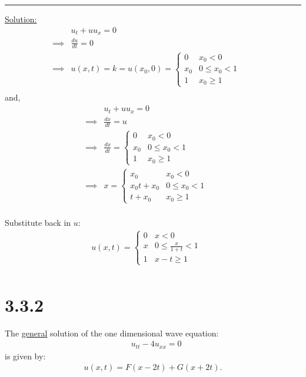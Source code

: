 \documentclass{article}
\begin{document}
\begin{center}
  \noindent\rule{8cm}{0.4pt}
\end{center}

\underline{Solution:}
\begin{align*}
  &u_t + u u_x = 0 &&\\
  \implies& \frac{du}{dt} = 0 &&\\
  \implies& u(x,t) = k = u(x_0, 0) = \begin{cases}
    0 & x_0 < 0 \\
    x_0 & 0 \leq x_0 < 1 \\
    1 & x_0 \geq 1
  \end{cases} &&\\
\end{align*}
and,
\begin{align*}
  &u_t + u u_x = 0 &&\\
  \implies& \frac{dx}{dt} = u &&\\
  \implies& \frac{dx}{dt} = \begin{cases}
    0 & x_0 < 0 \\
    x_0 & 0 \leq x_0 < 1 \\
    1 & x_0 \geq 1
  \end{cases} &&\\
  \implies& x = \begin{cases}
    x_0 & x_0 < 0 \\
    x_0t + x_0 & 0 \leq x_0 < 1 \\
    t + x_0 & x_0 \geq 1
  \end{cases} &&\\
\end{align*}

Substitute back in $u$:
\begin{align*}
  u(x,t) = \begin{cases}
    0 & x < 0 \\
    x & 0 \leq \frac{x}{1+t} < 1 \\
    1 & x-t \geq 1
  \end{cases} &&\\
\end{align*}

\newpage

\section*{3.3.2}
The \underline{general} solution of the one dimensional wave equation:
\begin{align*}
  &u_{tt} - 4u_{xx} = 0
\end{align*}
is given by:
\begin{align*}
  u(x,t) = F(x-2t) + G(x+2t).
\end{align*}
\end{document}
